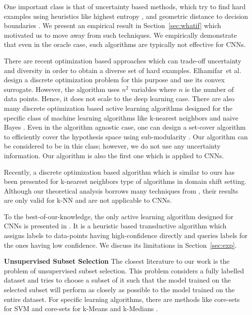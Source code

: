 \documentclass{article}
\begin{document}
One important class is that of uncertainty based methods, which try to find hard examples using heuristics like highest entropy \cite{joshi2009multi}, and geometric distance to decision boundaries \cite{tong2001support,brinker2003incorporating}. We present an empirical result in Section~\ref{sec:whatif} which motivated us to move away from such techniques. We empirically demonstrate that even in the oracle case, such algorithms are typically not effective for CNNs.

There are recent optimization based approaches which can trade-off uncertainty and diversity in order to obtain a diverse set of hard examples. Elhamifar~et al.  \cite{elhamifar2013convex} design a discrete optimization problem for this purpose and use its convex surrogate. However, the algorithm uses $n^2$ variables where $n$ is the number of data points. Hence, it does not scale to the deep learning case. There are also many discrete optimization based active learning algorithms designed for the specific class of machine learning algorithms like k-nearest neighbors and naive Bayes \cite{wei2015submodularity}. Even in the algorithm agnostic case, one can design a set-cover algorithm to efficiently cover the hypothesis space using sub-modularity \cite{guillory2010interactive, golovin2011adaptive}. Our algorithm can be considered to be in this class; however, we do not use any uncertainty information. Our algorithm is also the first one which is applied to CNNs.

Recently, a discrete optimization based algorithm \cite{BerlindU15} which is similar to ours has been presented for k-nearest neighbors type of algorithms in domain shift setting. Although our theoretical analysis borrows many techniques from \cite{BerlindU15}, their results are only valid for k-NN and are not applicable to CNNs. 

To the best-of-our-knowledge, the only active learning algorithm designed for CNNs is presented in \cite{wang2016cost}. It is a heuristic based transductive algorithm which assigns labels to data-points having high-confidence directly and queries labels for the ones having low confidence. We discuss its limitations in Section~\ref{sec:exp}.


\noindent\textbf{Unsupervised Subset Selection}
The closest literature to our work is the problem of unsupervised subset selection. This problem considers a fully labelled dataset and tries to choose a subset of it such that the model trained on the selected subset will perform as closely as possible to the model trained on the entire dataset. For specific learning algorithms, there are methods like core-sets for SVM \cite{tsang2005core} and core-sets for k-Means and k-Medians \cite{har2005smaller}. %
\end{document}
